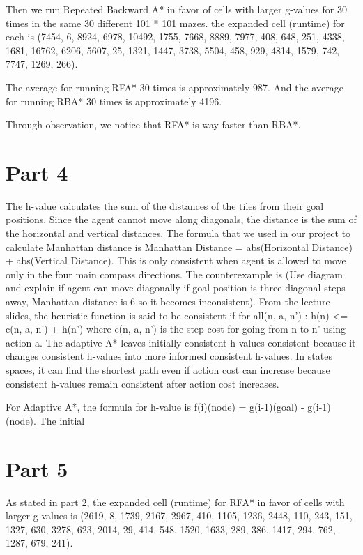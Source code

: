 \documentclass{article}
\begin{document}
Then we run Repeated Backward A* in favor of cells with larger g-values for 30 times in the same 30 different 101 * 101 mazes. the expanded cell (runtime) for each is 
(7454, 6, 8924, 6978, 10492, 1755, 7668, 8889, 7977, 408, 648, 251, 4338, 1681, 16762, 6206, 5607, 25, 1321, 1447, 3738, 5504, 458, 929, 4814, 1579, 742, 7747, 1269, 266).

The average for running RFA* 30 times is approximately 987. And the average for running RBA* 30 times is approximately 4196.

Through observation, we notice that RFA* is way faster than RBA*.  

\section*{Part 4}
\hspace{5mm}
The h-value calculates the sum of the distances of the tiles from their goal positions. Since the agent cannot move along diagonals, the distance is the sum of the horizontal and vertical distances. The formula that we used in our project to calculate Manhattan distance is Manhattan Distance = abs(Horizontal Distance) + abs(Vertical Distance). This is only consistent when agent is allowed to move only in the four main compass directions. The counterexample is (Use diagram and explain if agent can move diagonally if goal position is three diagonal steps away, Manhattan distance is 6 so it becomes inconsistent).
From the lecture slides, the heuristic function is said to be consistent if
        for all(n, a, n’) : h(n) <= c(n, a, n’) + h(n’)
where c(n, a, n’) is the step cost for going from n to n’ using action a.
The adaptive A* leaves initially consistent h-values consistent because it changes consistent h-values into more informed consistent h-values. In states spaces, it can find the shortest path even if action cost can increase because consistent h-values remain consistent after action cost increases.

For Adaptive A*, the formula for h-value is f{\tiny (i)}(node) = g{\tiny (i-1)}(goal) - g{\tiny (i-1)}(node). The initial 

\section*{Part 5}
\hspace{5mm}
As stated in part 2, the expanded cell (runtime) for RFA* in favor of cells with larger g-values is
(2619, 8, 1739, 2167, 2967, 410, 1105, 1236, 2448, 110, 243, 151, 1327, 630, 3278, 623, 2014, 29, 414, 548, 1520, 1633, 289, 386, 1417, 294, 762, 1287, 679, 241).
\end{document}

